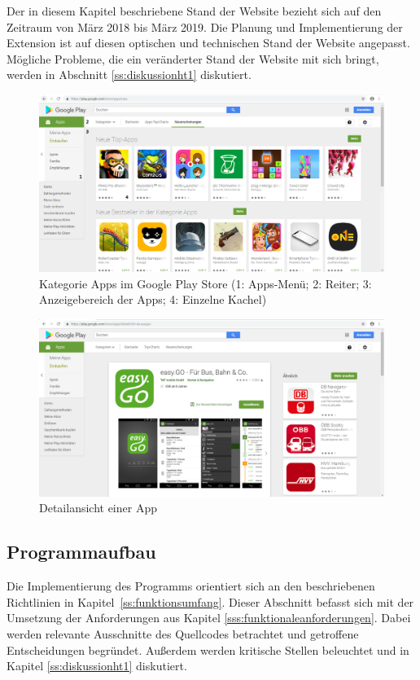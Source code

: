 Der in diesem Kapitel beschriebene Stand der Website bezieht sich auf den Zeitraum von März 2018 bis März 2019. Die Planung und Implementierung der Extension ist auf diesen optischen und technischen Stand der Website angepasst. Mögliche Probleme, die ein veränderter Stand der Website mit sich bringt, werden in Abschnitt \ref{ss:diskussionht1} diskutiert.

\begin{figure}[H]
	\centering
	\includegraphics[width=1\textwidth]{pics/playstore1num.png}
	\caption{Kategorie Apps im Google Play Store (1: Apps-Menü; 2: Reiter; 3: Anzeigebereich der Apps; 4: Einzelne Kachel)}
	\label{playstore1}
\end{figure}

\begin{figure}[H]
	\centering
	\includegraphics[width=1\textwidth]{pics/playstore2.png}
	\caption{Detailansicht einer App}
	\label{playstore2}
\end{figure}

\subsection{Programmaufbau}
\label{ss:programmaufbau}
Die Implementierung des Programms orientiert sich an den beschriebenen Richtlinien in Kapitel~\ref{ss:funktionsumfang}. Dieser Abschnitt befasst sich mit der Umsetzung der Anforderungen aus Kapitel \ref{sss:funktionaleanforderungen}. Dabei werden relevante Ausschnitte des Quellcodes betrachtet und getroffene Entscheidungen begründet. Außerdem werden kritische Stellen beleuchtet und in Kapitel \ref{ss:diskussionht1} diskutiert.


